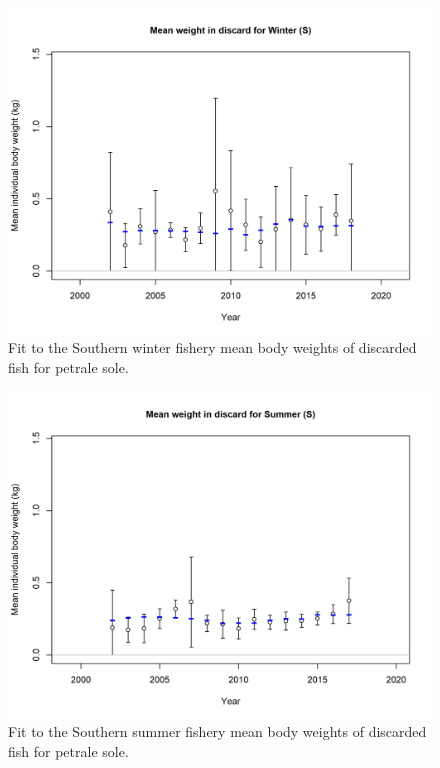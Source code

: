 \documentclass[12pt,]{article}
\begin{document}
\FloatBarrier

\begin{figure}
\centering
\includegraphics{r4ss/plots_mod1/bodywt_fit_fltWinter (S).png}
\caption{Fit to the Southern winter fishery mean body weights of
discarded fish for petrale sole. \label{fig:sw_bodywt_fit}}
\end{figure}

\FloatBarrier

\begin{figure}
\centering
\includegraphics{r4ss/plots_mod1/bodywt_fit_fltSummer (S).png}
\caption{Fit to the Southern summer fishery mean body weights of
discarded fish for petrale sole. \label{fig:ss_bodywt_fit}}
\end{figure}
\end{document}
